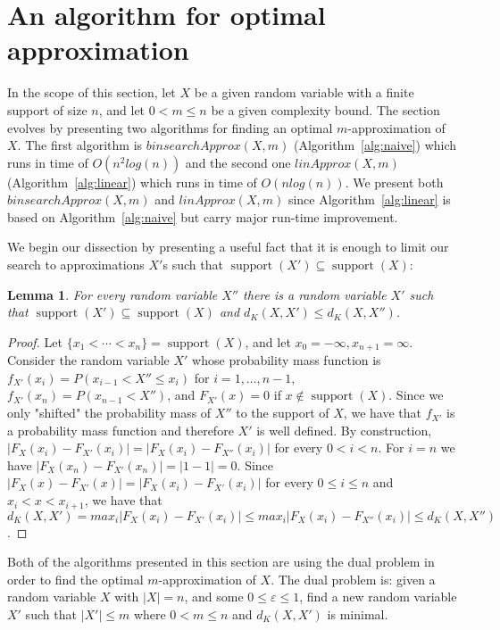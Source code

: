 \documentclass[letterpaper]{article} %
\newtheorem{lemma}[thm]{Lemma}
\DeclareMathOperator{\support}{support}
\begin{document}
\section{An algorithm for optimal approximation}\label{sec:algEfficient}
In the scope of this section, let $X$ be a given random variable with a finite support of size $n$, and let  $0<m\leq n$ be a given complexity bound. The section evolves by presenting two algorithms for finding an optimal $m$-approximation of $X$. The first algorithm is $binsearchApprox(X,m)$ (Algorithm~\ref{alg:naive}) which runs in time of $O(n^2log(n))$ and the second one $linApprox(X,m)$ (Algorithm~\ref{alg:linear}) which runs in time of $O(nlog(n))$. We present both $binsearchApprox(X,m)$ and $linApprox(X,m)$ since Algorithm~\ref{alg:linear} is based on Algorithm~\ref{alg:naive} but carry major run-time improvement.

We begin our dissection by presenting a useful fact that it is enough to limit our search to approximations $X'$s such that $\support(X') \subseteq \support(X)$:

\begin{lemma}\label{lem:supContained}
	For every random variable $X''$ there is a random variable $X'$ such that $\support(X') \subseteq \support(X)$ and $d_{K}(X,X')\leq d_{K}(X,X'')$.
\end{lemma}

\begin{proof}
	Let $\{x_1 <\cdots<x_n\} = \support(X)$, and let $x_0 = -\infty, x_{n+1}=\infty$. Consider the random variable $X'$ whose probability mass function is
	$f_{X'}(x_i) = P(x_{i-1} < X'' \leq x_i)$ for $i=1,\dots,n-1$,  $f_{X'}(x_n) = P(x_{n-1} < X'')$, and $F_{X'}(x)=0$ if $x\notin \support(X)$.  Since we only "shifted" the probability mass of $X''$ to the support of $X$, we have that $f_{X'}$ is a probability mass function and therefore $X'$ is well defined. 	
	By construction, $|F_{X}(x_i)-F_{X'}(x_i)| = |F_{X}(x_i)-F_{X''}(x_i)|$ for every  $0 <  i < n$. For $i=n$ we have $|F_{X}(x_n)-F_{X'}(x_n)| = |1-1|=0$.
	Since $|F_{X}(x)-F_{X'}(x)| = |F_{X}(x_i)-F_{X'}(x_i)|$ for every  $0\leq   i  \leq  n$  and $x_i<x<x_{i+1}$, we have that $d_K(X,X')=max_{i}|F_{X}(x_i)-F_{X'}(x_i)|\leq max_{i}|F_{X}(x_i)-F_{X''}(x_i)|\leq d_K(X,X'')$.
\end{proof} 

Both of the algorithms presented in this section are using the dual problem in order to find the optimal $m$-approximation of $X$. The dual problem is: given a random variable $X$ with $|X| = n$, and some $0 \leq \varepsilon \leq 1$, find a new random variable $X'$ such that $|X'|\leq m$ where $0< m \leq n$ and $d_K(X,X')$ is minimal. 
\end{document}
